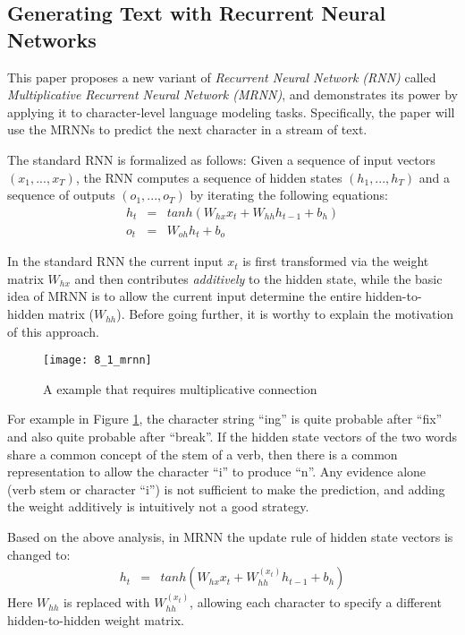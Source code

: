 \subsection{Generating Text with Recurrent Neural Networks \cite{Martens2011}}

This paper proposes a new variant of \emph{Recurrent Neural Network (RNN)} called \emph{Multiplicative Recurrent Neural Network (MRNN)}, and demonstrates its power by applying it to character-level language modeling tasks. Specifically, the paper will use the MRNNs to predict the next character in a stream of text.

The standard RNN is formalized as follows: Given a sequence of input vectors $(x_1, ..., x_T)$, the RNN computes a sequence of hidden states $(h_1, ..., h_T)$ and a sequence of outputs $(o_1, ..., o_T)$ by iterating the following equations:
\begin{eqnarray}
h_t &=& tanh(W_{hx}x_t + W_{hh}h_{t-1} + b_h)\\
o_t &=& W_{oh}h_t + b_o
\end{eqnarray}

In the standard RNN the current input $x_t$ is first transformed via the weight matrix $W_{hx}$ and then contributes \emph{additively} to the hidden state, while the basic idea of MRNN is to allow the current input determine the entire hidden-to-hidden matrix ($W_{hh}$). Before going further, it is worthy to explain the motivation of this approach.

\begin{figure}[htbp]
  \centering
  \texttt{[image: 8\_1\_mrnn]}\\
  \caption{A example that requires multiplicative connection}\label{fig:mrnn}
\end{figure}

For example in Figure \ref{fig:mrnn}, the character string ``ing'' is quite probable after ``fix'' and also quite probable after ``break''. If the hidden state vectors of the two words share a common concept of the stem of a verb, then there is a common representation to allow the character ``i'' to produce ``n''. Any evidence alone (verb stem or character ``i'') is not sufficient to make the prediction, and adding the weight additively is intuitively not a good strategy.

Based on the above analysis, in MRNN the update rule of hidden state vectors is changed to:
\begin{eqnarray}
h_t &=& tanh(W_{hx}x_t + W^{(x_t)}_{hh}h_{t-1} + b_h)
\end{eqnarray}
Here $W_{hh}$ is replaced with $W_{hh}^{(x_t)}$, allowing each character to specify a different hidden-to-hidden weight matrix.

